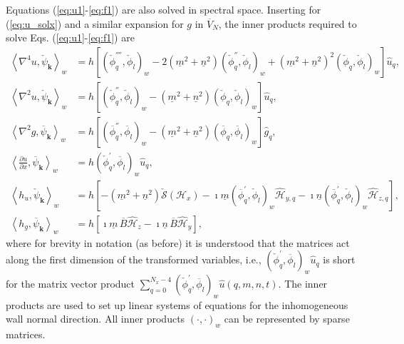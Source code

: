 \documentclass[11pt, oneside]{article}
\newcommand{\N}[1]{\check{#1}}
\newcommand{\D}[1]{\overline{#1}}
\begin{document}
Equations (\ref{eq:u1}-\ref{eq:f1}) are also solved in spectral space. 
Inserting for (\ref{eq:u_solx}) and a similar expansion for $g$ in $\D{V}_N$, 
the inner products required to solve Eqs. (\ref{eq:u1}-\ref{eq:f1}) are
\begin{align}
\left<\nabla^4u, \N{\psi}_{\bm{k}}\right>_w &= h\left[ \left( 
\N{\phi}_q^{''''}, 
\N{\phi}_l\right)_w -2(\underline{m}^2+\underline{n}^2) \left( \N{\phi}_q^{''}, 
\N{\phi}_l\right)_w + (\underline{m}^2+\underline{n}^2)^2\left( \N{\phi}_q, 
\N{\phi}_l\right)_w  \right] \hat{u}_q, \\
\left< \nabla^2 u, \N{\psi}_{\bm{k}}\right>_w &= h\left[\left( \N{\phi}_q^{''}, 
\N{\phi}_l\right)_w - (\underline{m}^2+\underline{n}^2)\left( \N{\phi}_q, 
\N{\phi}_l \right)_w \right] \hat{u}_q, \\
\left< \nabla^2 g, \D{\psi}_{\bm{k}}\right>_w &= h\left[\left( \D{\phi}_q^{''}, 
\D{\phi}_l\right)_w - (\underline{m}^2+\underline{n}^2)\left( \D{\phi}_q, 
\D{\phi}_l \right)_w \right] \hat{g}_q, \\
\left<\frac{\partial u}{\partial x}, \D{\psi}_{\bm{k}}\right>_w &=
h\left(\N{\phi}_q^{'}, \D{\phi}_l\right)_w \hat{u}_q, \\
\left<h_u, \N{\psi}_{\bm{k}} \right>_w &= 
h\left[-(\underline{m}^2+\underline{n}^2) 
\N{\mathcal{S}}(\mathcal{H}_x) - \imath \underline{m}\left(\D{\phi}_q^{'}, 
\N{\phi}_l \right)_w \hat{\mathcal{H}}_{y, q} - \imath 
\underline{n}\left(\D{\phi}_q^{'}, \N{\phi}_l \right)_w 
\hat{\mathcal{H}}_{z, q}\right], 
\\
\left< h_g, \D{\psi}_{\bm{k}} \right>_w &= h\left[ \imath \underline{m}\, \D{B} 
\hat{\mathcal{H}}_z - \imath \underline{n}\, \D{B} \hat{\mathcal{H}}_{y} 
\right],
\end{align}
where for brevity in notation (as before) it is understood that the matrices 
act along the first dimension of the transformed variables, i.e.,  $ 
\left(\N{\phi}_q^{'}, \D{\phi}_l\right)_w \hat{u}_q$ is short for the matrix 
vector product $ \sum_{q=0}^{N_x-4}\left( \N{\phi}_q^{'}, \D{\phi}_l\right)_w 
\hat{u}(q, {m}, {n}, t)$. The inner products are used to set up linear systems 
of equations for the inhomogeneous wall normal direction. All inner products 
$\left(\cdot, \cdot\right)_w$ can be represented by sparse matrices.
\end{document}
